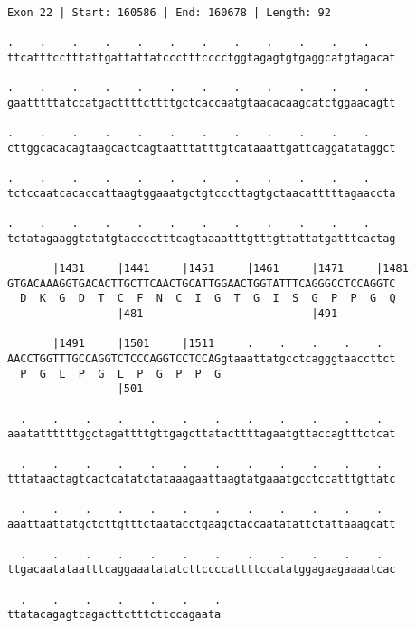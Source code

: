 \documentclass{article}
\begin{document}
\begin{Verbatim}
Exon 22 | Start: 160586 | End: 160678 | Length: 92
 
.    .    .    .    .    .    .    .    .    .    .    .    
ttcatttcctttattgattattatccctttcccctggtagagtgtgaggcatgtagacat
  
.    .    .    .    .    .    .    .    .    .    .    .    
gaatttttatccatgacttttcttttgctcaccaatgtaacacaagcatctggaacagtt
  
.    .    .    .    .    .    .    .    .    .    .    .    
cttggcacacagtaagcactcagtaatttatttgtcataaattgattcaggatataggct
  
.    .    .    .    .    .    .    .    .    .    .    .    
tctccaatcacaccattaagtggaaatgctgtcccttagtgctaacatttttagaaccta
  
.    .    .    .    .    .    .    .    .    .    .    .    
tctatagaaggtatatgtacccctttcagtaaaatttgtttgttattatgatttcactag
  
       |1431     |1441     |1451     |1461     |1471     |1481
GTGACAAAGGTGACACTTGCTTCAACTGCATTGGAACTGGTATTTCAGGGCCTCCAGGTC
  D  K  G  D  T  C  F  N  C  I  G  T  G  I  S  G  P  P  G  Q
                 |481                          |491         
  
       |1491     |1501     |1511     .    .    .    .    .  
AACCTGGTTTGCCAGGTCTCCCAGGTCCTCCAGgtaaattatgcctcagggtaaccttct
  P  G  L  P  G  L  P  G  P  P  G                           
                 |501                                       
  
  .    .    .    .    .    .    .    .    .    .    .    .  
aaatattttttggctagattttgttgagcttatacttttagaatgttaccagtttctcat
  
  .    .    .    .    .    .    .    .    .    .    .    .  
tttataactagtcactcatatctataaagaattaagtatgaaatgcctccatttgttatc
  
  .    .    .    .    .    .    .    .    .    .    .    .  
aaattaattatgctcttgtttctaatacctgaagctaccaatatattctattaaagcatt
  
  .    .    .    .    .    .    .    .    .    .    .    .  
ttgacaatataatttcaggaaatatatcttccccattttccatatggagaagaaaatcac
  
  .    .    .    .    .    .    .
ttatacagagtcagacttctttcttccagaata
\end{Verbatim}
\newpage
\end{document}
